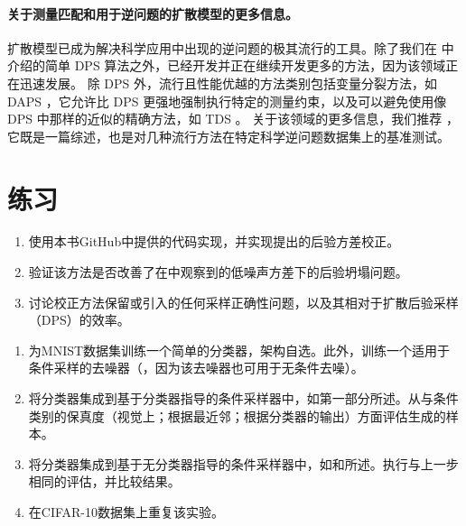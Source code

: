 \documentclass[../../book-main_zh.tex]{subfiles}
\begin{document}
\paragraph{关于测量匹配和用于逆问题的扩散模型的更多信息。}

扩散模型已成为解决科学应用中出现的逆问题的极其流行的工具。除了我们在  中介绍的简单 DPS 算法之外，已经开发并正在继续开发更多的方法，因为该领域正在迅速发展。
除 DPS 外，流行且性能优越的方法类别包括变量分裂方法，如 DAPS \cite{Zhang2024-ha}，它允许比 DPS 更强地强制执行特定的测量约束，以及可以避免使用像 DPS 中那样的近似的精确方法，如 TDS \cite{wu2023practical}。
关于该领域的更多信息，我们推荐 \cite{zheng2025inversebench}，它既是一篇综述，也是对几种流行方法在特定科学逆问题数据集上的基准测试。

\section{练习}

\begin{exercise}[对DPS的后验方差校正]

\begin{enumerate}
\item 使用本书GitHub中提供的代码实现，并实现\textcite{rozet2024learning}提出的后验方差校正。
\item 验证该方法是否改善了在中观察到的低噪声方差下的后验坍塌问题。
\item 讨论校正方法保留或引入的任何采样正确性问题，以及其相对于扩散后验采样（DPS）的效率。
\end{enumerate}

\end{exercise}

\begin{exercise}[在MNIST上的条件采样]
\begin{enumerate}
\item 为MNIST数据集训练一个简单的分类器，架构自选。此外，训练一个适用于条件采样的去噪器（，因为该去噪器也可用于无条件去噪）。
\item 将分类器集成到基于分类器指导的条件采样器中，如第一部分所述。从与条件类别的保真度（视觉上；根据最近邻；根据分类器的输出）方面评估生成的样本。
\item 将分类器集成到基于无分类器指导的条件采样器中，如和所述。执行与上一步相同的评估，并比较结果。
\item 在CIFAR-10数据集上重复该实验。
\end{enumerate}

\end{exercise}
\end{document}
